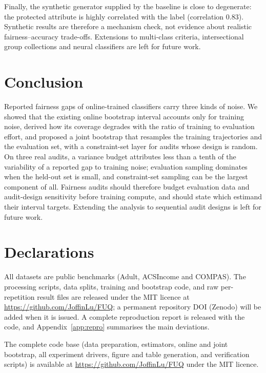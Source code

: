 \documentclass[pdflatex,sn-basic]{sn-jnl}
\begin{document}
Finally, the synthetic generator supplied by the baseline is close to degenerate: the protected
attribute is highly correlated with the label (correlation $0.83$).  Synthetic results are therefore a
mechanism check, not evidence about realistic fairness--accuracy trade-offs.  Extensions to multi-class criteria, intersectional group
collections and neural classifiers are left for future work.

\section{Conclusion}
\label{sec:conclusion}
Reported fairness gaps of online-trained classifiers carry three kinds of noise.  We showed that the
existing online bootstrap interval accounts only for training noise, derived how its coverage degrades
with the ratio of training to evaluation effort, and proposed a joint bootstrap that resamples the
training trajectories and the evaluation set, with a constraint-set layer for audits whose design is
random.  On three real audits, a variance budget attributes less than a tenth of the variability of a
reported gap to training noise; evaluation sampling dominates when the held-out set is small, and
constraint-set sampling can be the largest component of all.  Fairness audits should therefore budget
evaluation data and audit-design sensitivity before training compute, and should state which estimand
their interval targets.  Extending the analysis to sequential audit designs is left for future work.

\section*{Declarations}


All datasets are public benchmarks (Adult, ACSIncome and COMPAS).
The processing scripts, data splits, training and bootstrap code, and raw per-repetition result
files are released under the MIT licence at \url{https://github.com/JoffinLu/FUQ}; a permanent
repository DOI (Zenodo) will be added when it is issued.  A complete reproduction report is
released with the code, and Appendix~\ref{app:repro} summarises the main deviations.


The complete code base (data preparation, estimators, online and
joint bootstrap, all experiment drivers, figure and table generation, and verification scripts)
is available at \url{https://github.com/JoffinLu/FUQ} under the MIT licence.
\end{document}

